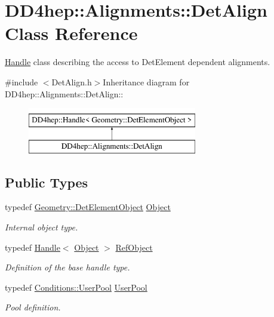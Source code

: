 \hypertarget{class_d_d4hep_1_1_alignments_1_1_det_align}{
\section{DD4hep::Alignments::DetAlign Class Reference}
\label{class_d_d4hep_1_1_alignments_1_1_det_align}
}


\hyperlink{class_d_d4hep_1_1_handle}{Handle} class describing the access to DetElement dependent alignments.  


{\ttfamily \#include $<$DetAlign.h$>$}Inheritance diagram for DD4hep::Alignments::DetAlign::\begin{figure}[H]
\begin{center}
\leavevmode
\includegraphics[height=2cm]{class_d_d4hep_1_1_alignments_1_1_det_align}
\end{center}
\end{figure}
\subsection*{Public Types}
\begin{DoxyCompactItemize}
\item 
typedef \hyperlink{class_d_d4hep_1_1_geometry_1_1_det_element_object}{Geometry::DetElementObject} \hyperlink{class_d_d4hep_1_1_alignments_1_1_det_align_ae49c039feb46ce85c64fecb6cf669f45}{Object}
\begin{DoxyCompactList}\small\item\em Internal object type. \item\end{DoxyCompactList}\item 
typedef \hyperlink{class_d_d4hep_1_1_handle}{Handle}$<$ \hyperlink{class_d_d4hep_1_1_geometry_1_1_det_element_object}{Object} $>$ \hyperlink{class_d_d4hep_1_1_alignments_1_1_det_align_aefb28d8de174c8d7efe86b45829701ff}{RefObject}
\begin{DoxyCompactList}\small\item\em Definition of the base handle type. \item\end{DoxyCompactList}\item 
typedef \hyperlink{class_d_d4hep_1_1_conditions_1_1_user_pool}{Conditions::UserPool} \hyperlink{class_d_d4hep_1_1_alignments_1_1_det_align_a0595e4c0ee7f454cf5e9c5d32b718aca}{UserPool}
\begin{DoxyCompactList}\small\item\em Pool definition. \item\end{DoxyCompactList}\end{DoxyCompactItemize}
